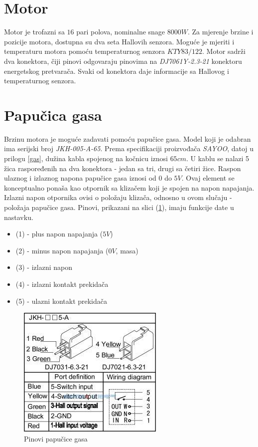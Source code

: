 \section{Motor}

\qquad Motor je trofazni sa $16$ pari polova, nominalne snage $8000W$. Za mjerenje brzine i pozicije motora, dostupna su dva seta Hallovih senzora. Moguće je mjeriti i temperaturu motora pomoću temperaturnog senzora $KTY83/122$. Motor sadrži dva konektora, čiji pinovi odgovaraju pinovima na \textit{DJ7061Y-2.3-21} konektoru energetskog pretvarača. Svaki od konektora daje informacije sa Hallovog i temperaturnog senzora.

\section{Papučica gasa}

\qquad Brzinu motora je moguće zadavati pomoću papučice gasa. Model koji je odabran ima serijski broj \textit{JKH-005-A-65}. Prema specifikaciji proizvođača \textit{SAYOO}, datoj u prilogu \ref{gas}, dužina kabla spojenog na kočnicu iznosi $65cm$. U kablu se nalazi 5 žica raspoređenih na dva konektora - jedan sa tri, drugi sa četiri žice. Raspon ulaznog i izlaznog napona papučice gasa iznosi od $0$ do $5V$. Ovaj element se konceptualno ponaša kao otpornik sa klizačem koji je spojen na napon napajanja. Izlazni napon otpornika ovisi o položaju klizača, odnosno u ovom slučaju - položaja papučice gasa. Pinovi, prikazani na slici (\ref{fig:gas}), imaju funkcije date u nastavku.

\begin{itemize}
	\item (1) - plus napon napajanja ($5V$)
	\item (2) - minus napon napajanja ($0V$, masa)
	\item (3) - izlazni napon
	\item (4) - izlazni kontakt prekidača
	\item (5) - ulazni kontakt prekidača
\end{itemize}

\begin{figure}
\centering
\includegraphics[scale=1]{slike/foot_throttle.png}
\caption{Pinovi papučice gasa}
\label{fig:gas}
\end{figure}


